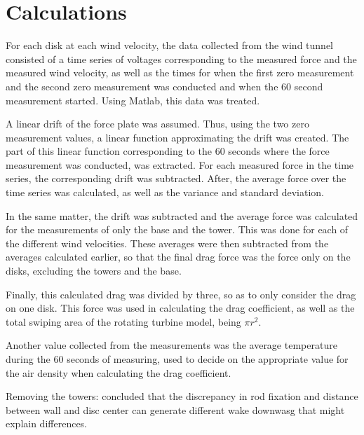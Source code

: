 \section{Calculations}

For each disk at each wind velocity, the data collected from the wind tunnel consisted of a time series of voltages corresponding to the measured force and the measured wind velocity, as well as the times for when the first zero measurement and the second zero measurement was conducted and when the 60 second measurement started. Using Matlab, this data was treated.

A linear drift of the force plate was assumed. Thus, using the two zero measurement values, a linear function approximating the drift was created. The part of this linear function corresponding to the 60 seconds where the force measurement was conducted, was extracted. For each measured force in the time series, the corresponding drift was subtracted. After, the average force over the time series was calculated, as well as the variance and standard deviation. 

In the same matter, the drift was subtracted and the average force was calculated for the measurements of only the base and the tower. This was done for each of the different wind velocities. These averages were then subtracted from the averages calculated earlier, so that the final drag force was the force only on the disks, excluding the towers and the base. 

Finally, this calculated drag was divided by three, so as to only consider the drag on one disk. This force was used in calculating the drag coefficient, as well as the total swiping area of the rotating turbine model, being $\pi r^2$. 

Another value collected from the measurements was the average temperature during the 60 seconds of measuring, used to decide on the appropriate value for the air density when calculating the drag coefficient. 

Removing the towers: 
\cite{Aubrun2019} concluded that the discrepancy in rod fixation and distance between wall and disc center can generate different wake downwasg that might explain differences. 